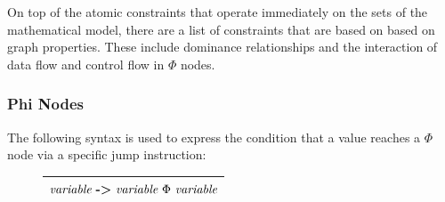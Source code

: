 
    On top of the atomic constraints that operate immediately on the sets of
    the mathematical model, there are a list of constraints that are based on
    based on graph properties.
    These include dominance relationships and the interaction of data flow and
    control flow in $\Phi$ nodes.


\subsubsection*{Phi Nodes}

    The following syntax is used to express the condition that a value reaches a
    $\Phi$ node via a specific jump instruction:
\begin{figure}[h]
    \centering
    \begin{tabular}{|c|}
        \hline
        $\text{\it variable}\ \text{\bf ->}\ \text{\it variable}\ \Phi\ \text{\it variable}$\\
        \hline
    \end{tabular}
\end{figure}

